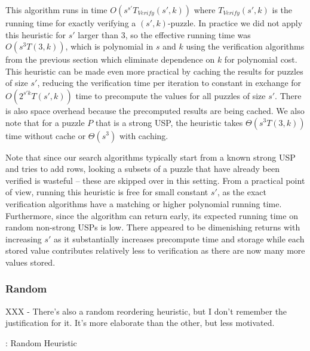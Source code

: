 \documentclass[11pt]{article}
\begin{document}
This algorithm runs in time $O(s^{s'} T_{Verify}(s', k))$ where
$T_{Verify}(s',k)$ is the running time for exactly verifying a
$(s',k)$-puzzle.  In practice we did not apply this heuristic for $s'$
larger than $3$, so the effective running time was $O(s^3 T(3,k))$,
which is polynomial in $s$ and $k$ using the verification algorithms
from the previous section which eliminate dependence on $k$ for
polynomial cost.  This heuristic can be made even more practical by
caching the results for puzzles of size $s'$, reducing the
verification time per iteration to constant in exchange for
$O(2^{s'k}T(s',k))$ time to precompute the values for all puzzles of
size $s'$.  There is also space overhead because the precomputed
results are being cached.  We also note that for a puzzle $P$ that is
a strong USP, the heuristic takes $\Theta(s^3 T(3,k))$ time without
cache or $\Theta(s^3)$ with caching.

Note that since our search algorithms typically start from a known
strong USP and tries to add rows, looking a subsets of a puzzle that
have already been verified is wasteful -- these are skipped over in
this setting.  From a practical point of view, running this heuristic
is free for small constant $s'$, as the exact verification algorithms
have a matching or higher polynomial running time.  Furthermore, since
the algorithm can return early, its expected running time on random
non-strong USPs is low.  There appeared to be dimenishing returns with
increasing $s'$ as it substantially increases precompute time and
storage while each stored value contributes relatively less to
verification as there are now many more values stored.

\subsubsection{Random}

XXX - There's also a random reordering heuristic, but I don't remember
the justification for it.  It's more elaborate than the other, but
less motivated.

\begin{algorithm}
  \caption{: Random Heuristic}
  \label{alg:random}
\begin{algorithmic}[1]
  \EndFunction
\end{algorithmic}
\end{algorithm} 
\end{document}
